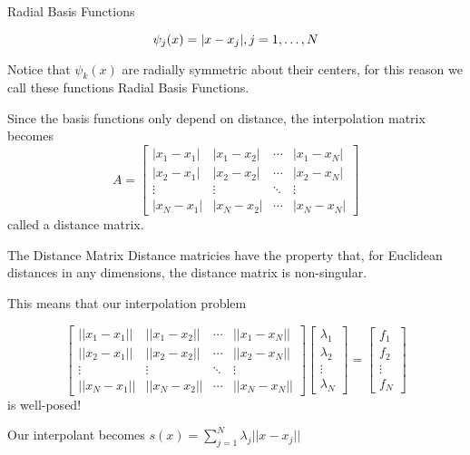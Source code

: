 \documentclass[12pt,t]{beamer}
\newcommand{\subt}[1]{{\footnotesize \color{subtitle} {#1}}}
\begin{document}
\begin{frame}{Radial Basis Functions}

\begin{equation*}
\psi_j(x)=|x-x_j|, j=1, \mathellipsis, N
\end{equation*}

Notice that $\psi_k(x)$ are radially symmetric about their centers, for this reason we call these functions \subt{Radial Basis Functions}.
\bigskip

Since the basis functions only depend on distance, the interpolation matrix becomes
\begin{equation*}
A=
\begin{bmatrix}
|x_1-x_1| & |x_1-x_2| & \cdots & |x_1-x_N|\\
|x_2-x_1| & |x_2-x_2|& \cdots & |x_2-x_N|\\
\vdots & \vdots & \ddots & \vdots\\
|x_N-x_1| & |x_N-x_2|& \cdots & |x_N-x_N|
\end{bmatrix}
\end{equation*}
called a \subt{distance matrix}.

\note{}
\end{frame}

\begin{frame}{The Distance Matrix}
Distance matricies have the property that, for Euclidean distances in any dimensions, the distance matrix is non-singular.
\bigskip

This means that our interpolation problem

\begin{equation*}
\begin{bmatrix}
||x_1-x_1|| & ||x_1-x_2|| & \cdots & ||x_1-x_N||\\
||x_2-x_1|| & ||x_2-x_2||& \cdots & ||x_2-x_N||\\
\vdots & \vdots & \ddots & \vdots\\
||x_N-x_1|| & ||x_N-x_2||& \cdots & ||x_N-x_N||
\end{bmatrix}
\begin{bmatrix}
\lambda_1\\
\lambda_2\\
\vdots\\
\lambda_N
\end{bmatrix}
=
\begin{bmatrix}
f_1\\
f_2\\
\vdots\\
f_N
\end{bmatrix}
\end{equation*}
is well-posed!
\bigskip

Our interpolant becomes 
\subt{$s(x)=\sum_{j=1}^N \lambda_j ||x-x_j|| $}

\note{}
\end{frame}
\end{document}
